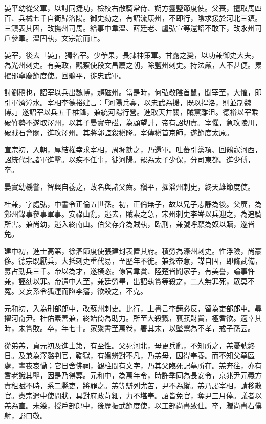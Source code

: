 \begin{pinyinscope}
 晏平幼從父軍，以討同捷功，檢校右散騎常侍、朔方靈鹽節度使。父喪，擅取馬四百、兵械七千自衛歸洛陽。御史劾之，有詔流康州，不即行，陰求援於河北三鎮。三鎮表其困，改撫州司馬。給事中韋溫、薛廷老、盧弘宣等還詔不敢下，改永州司戶參軍。溫固執，文宗諭而止。



 晏宰，後去「晏」，獨名宰。少拳果，長隸神策軍。甘露之變，以功兼御史大夫，為光州刺史。有美政，觀察使段文昌薦之朝，除鹽州刺史。持法嚴，人不甚便。累擢邠寧慶節度使。回鶻平，徙忠武軍。



 討劉稹也，詔宰以兵出魏博，趨磁州。當是時，何弘敬陰首鼠，聞宰至，大懼，即引軍濟漳水。宰相李德裕建言：「河陽兵寡，以忠武為援，既以捍洛，則並制魏博。」遂詔宰以兵五千椎鋒，兼統河陽行營。進取天井關，賊黨離沮。德裕以宰乘破竹勢不遂取澤州，以其子晏實守磁，為顧望計，帝有詔切責。宰懼，急攻陵川，破賊石會關，進攻澤州。其將郭誼殺稹降。宰傳稹首京師，遂節度太原。



 宣宗初，入朝，厚結權幸求宰相，周墀劾之，乃還軍。吐蕃引黨項、回鶻寇河西，詔統代北諸軍進擊。以疾不任事，徙河陽。罷為太子少保，分司東都。進少傅，卒。



 晏實幼機警，智興自養之，故名與諸父齒。稹平，擢淄州刺史，終天雄節度使。



 杜兼，字處弘，中書令正倫五世孫。初，正倫無子，故以兄子志靜為後。父廙，為鄭州錄事參事軍事。安祿山亂，逃去，賊索之急，宋州刺史李岑以兵迎之，為追騎所害。兼尚幼，逃入終南山。伯父存介為賊執，臨刑，兼號呼願為奴以贖，遂皆免。



 建中初，進士高第，徐泗節度使張建封表置其府。積勞為濠州刺史。性浮險，尚豪侈。德宗既厭兵，大抵刺史重代易，至歷年不徙。兼探帝意，謀自固，即脩武備，募占勁兵三千。帝以為才，遂橫恣。僚官韋賞、陸楚皆聞家子，有美譽，論事忤兼，誣劾以罪。帝遣中人至，兼廷勞畢，出詔執賞等殺之，二人無罪死，眾莫不冤。又妄系令狐運而陷李籓，欲殺之，不克。



 元和初，入為刑部郎中，改蘇州刺史。比行，上書言李錡必反，留為吏部郎中。尋擢河南尹。杜佑素善兼，終始倚為助力。所至大殺戮，裒蓺財貲，極耆欲。適幸其時，未嘗敗。卒，年七十。家聚書至萬卷，署其末，以墜鬻為不孝，戒子孫云。



 從弟羔，貞元初及進士第，有至性。父死河北，母更兵亂，不知所之，羔憂號終日。及兼為澤潞判官，鞫獄，有媼辨對不凡，乃羔母，因得奉養。而不知父墓區處，晝夜哀慟；它日舍佛祠，觀柱間有文字，乃其父臨死記墓所在。羔奔往，亦有耆老識其壟，因是乃得葬。元和中，為萬年令，時許季同為長安令，京兆尹元義方責租賦不時，系二縣吏，將罪之。羔等辯列尤苦，尹不為縱。羔乃謁宰相，請移散官。憲宗遣中使問狀，具對府政苛細，力不堪奉。詔皆免官，奪尹三月俸。議者以羔為直。未幾，授戶部郎中，後歷振武節度使，以工部尚書致仕。卒，贈尚書右僕射，謚曰敬。




\end{pinyinscope}
